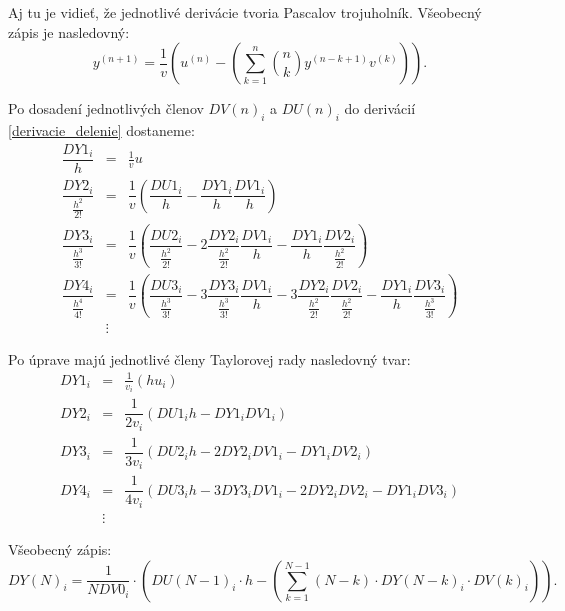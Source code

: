 Aj tu je vidieť, že jednotlivé derivácie tvoria Pascalov trojuholník. Všeobecný zápis je nasledovný:
\begin{equation}
y^{(n+1)} = \dfrac{1}{v} \left( u^{(n)} - \left( \sum_{k=1}^n \binom{n}{k} y^{(n-k+1)} v^{(k)} \right) \right) . \nonumber
\end{equation}
\bigskip

Po dosadení jednotlivých členov $ DV(n)_{i} $ a $ DU(n)_{i} $ do derivácií \eqref{derivacie_delenie} dostaneme:
\begin{eqnarray}
\dfrac{DY1_{i}}{h} & = & \frac{1}{v} u~\\
\dfrac{DY2_{i}}{\frac{h^{2}}{2!}} & = & \dfrac{1}{v} ( \dfrac{DU1_{i}}{h} - \dfrac{DY1_{i}}{h}\dfrac{DV1_{i}}{h} ) \nonumber \\
\dfrac{DY3_{i}}{\frac{h^{3}}{3!}} & = & \dfrac{1}{v} 
( \dfrac{DU2_{i}}{\frac{h^{2}}{2!}} - 
2\dfrac{DY2_{i}}{\frac{h^{2}}{2!}} \dfrac{DV1_{i}}{h} - 
\dfrac{DY1_{i}}{h} \dfrac{DV2_{i}}{\frac{h^{2}}{2!}} ) \nonumber \\
\dfrac{DY4_{i}}{\frac{h^{4}}{4!}} & = & \dfrac{1}{v} 
( \dfrac{DU3_{i}}{\frac{h^{3}}{3!}} - 
3\dfrac{DY3_{i}}{\frac{h^{3}}{3!}} \dfrac{DV1_{i}}{h} - 
3\dfrac{DY2_{i}}{\frac{h^{2}}{2!}} \dfrac{DV2_{i}}{\frac{h^{2}}{2!}} -
\dfrac{DY1_{i}}{h} \dfrac{DV3_{i}}{\frac{h^{3}}{3!}} ) \nonumber \\
& \vdots \nonumber & 
\end{eqnarray}


Po úprave majú jednotlivé členy Taylorovej rady nasledovný tvar:
\begin{eqnarray}
DY1_{i} & = & \frac{1}{v_{i}} (hu_{i}) \label{DY1_cleny_delenia} \\
DY2_{i} & = & \dfrac{1}{2v_{i}} (DU1_{i}h - DY1_{i}DV1_{i}) \label{DY2_cleny_delenia} \\
DY3_{i} & = & \dfrac{1}{3v_{i}} ( DU2_{i}h - 2DY2_{i}DV1_{i} - DY1_{i}DV2_{i} ) \label{DY3_cleny_delenia} \\
DY4_{i} & = & \dfrac{1}{4v_{i}} ( DU3_{i}h - 3DY3_{i}DV1_{i} - 2DY2_{i}DV2_{i} - DY1_{i}DV3_{i} ) \label{DY4_cleny_delenia} \\ 
& \vdots \nonumber & 
\end{eqnarray}

Všeobecný zápis:
\begin{equation}
DY(N)_{i} = \dfrac{1}{N DV0_{i}} \cdot \left( DU(N-1)_{i} \cdot h - \left( \sum_{k=1}^{N-1} (N-k) \cdot DY(N-k)_{i} \cdot DV(k)_{i} \right) \right)  .\label{suma_div}
\end{equation}
\bigskip


